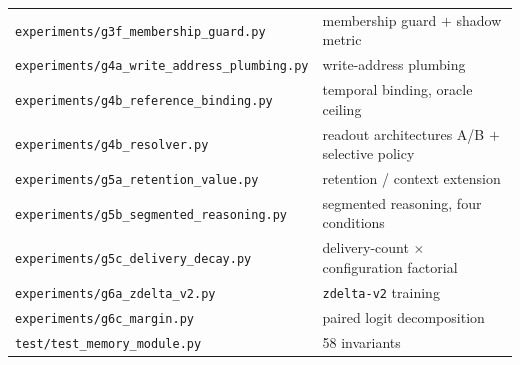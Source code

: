 \documentclass[11pt, a4paper]{article}
\begin{document}
\begin{longtable}{p{} p{}}
\verb|experiments/g3f_membership_guard.py| & membership guard $+$ shadow metric \\
\verb|experiments/g4a_write_address_plumbing.py| & write-address plumbing \\
\verb|experiments/g4b_reference_binding.py| & temporal binding, oracle ceiling \\
\verb|experiments/g4b_resolver.py| & readout architectures A/B $+$ selective policy \\
\verb|experiments/g5a_retention_value.py| & retention / context extension \\
\verb|experiments/g5b_segmented_reasoning.py| & segmented reasoning, four conditions \\
\verb|experiments/g5c_delivery_decay.py| & delivery-count $\times$ configuration factorial \\
\verb|experiments/g6a_zdelta_v2.py| & \verb|zdelta-v2| training \\
\verb|experiments/g6c_margin.py| & paired logit decomposition \\
\verb|test/test_memory_module.py| & 58 invariants \\
\bottomrule
\end{longtable}
\end{document}
